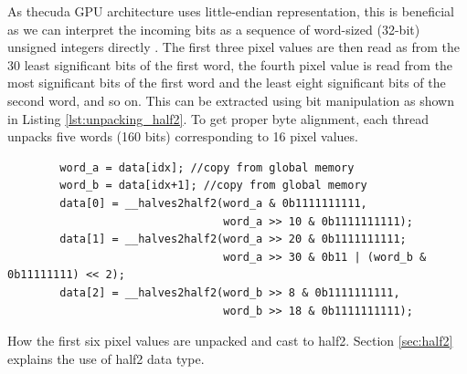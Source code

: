 As the\gls{cuda} GPU architecture uses little-endian representation, this is beneficial as we can interpret the incoming bits as a sequence of word-sized (32-bit) unsigned integers directly \cite[127]{nvidiaCUDAProgrammingGuide}.
The first three pixel values are then read as from the 30 least significant bits of the first word, the fourth pixel value is read from the most significant bits of the first word and the least eight significant bits of the second word, and so on.
This can be extracted using bit manipulation as shown in Listing \ref{lst:unpacking_half2}.
To get proper byte alignment, each thread unpacks five words (160 bits) corresponding to 16 pixel values.

\begin{listing}
    \begin{verbatim}
        word_a = data[idx]; //copy from global memory
        word_b = data[idx+1]; //copy from global memory
        data[0] = __halves2half2(word_a & 0b1111111111,
                                 word_a >> 10 & 0b1111111111);
        data[1] = __halves2half2(word_a >> 20 & 0b1111111111;
                                 word_a >> 30 & 0b11 | (word_b & 0b11111111) << 2);
        data[2] = __halves2half2(word_b >> 8 & 0b1111111111,
                                 word_b >> 18 & 0b1111111111);
    \end{verbatim}
    \caption{How the first six pixel values are unpacked and cast to \gls{half2}. Section \ref{sec:half2} explains the use of \gls{half2} data type.}
    \label{lst:unpacking_half2}
\end{listing}
